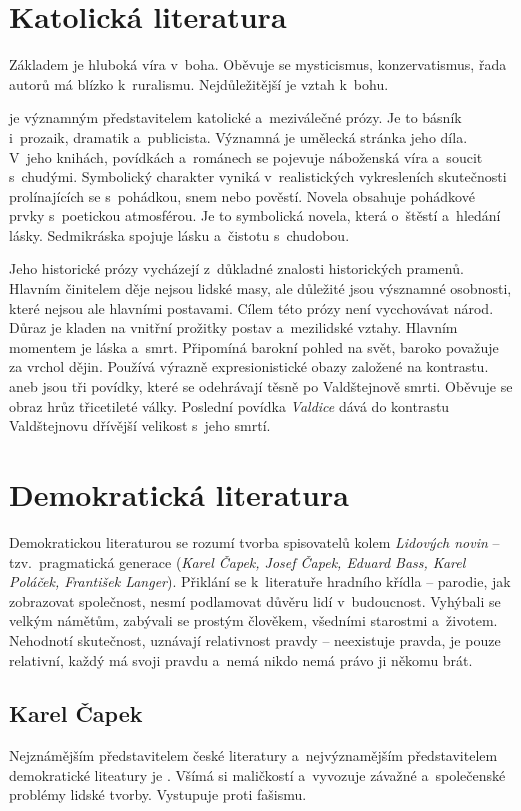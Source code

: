 \section{Katolická literatura}
Základem je hluboká víra v~boha. Oběvuje se mysticismus, konzervatismus,
řada autorů má blízko k~ruralismu. Nejdůležitější je vztah k~bohu.

\delic

 je významným představitelem katolické
a~meziválečné prózy. Je to básník i~prozaik, dramatik a~publicista.
Významná je umělecká stránka jeho díla. V~jeho knihách, povídkách
a~románech se pojevuje náboženská víra a~soucit s~chudými. Symbolický
charakter vyniká v~realistických vykresleních skutečnosti prolínajících
se s~pohádkou, snem nebo pověstí. Novela  obsahuje
pohádkové prvky s~poetickou atmosférou. Je to symbolická novela, která
o~štěstí a~hledání lásky. Sedmikráska spojuje lásku a~čistotu s~chudobou.

Jeho historické prózy vycházejí z~důkladné znalosti historických
pramenů. Hlavním činitelem děje nejsou lidské masy, ale důležité jsou
výsznamné osobnosti, které nejsou ale hlavními postavami. Cílem této
prózy není vycchovávat národ. Důraz je kladen na vnitřní prožitky postav
a~mezilidské vztahy. Hlavním momentem je láska a~smrt. Připomíná barokní
pohled na svět, baroko považuje za vrchol dějin. Používá výrazně
expresionistické obazy založené na kontrastu.  aneb
 jsou tři povídky, které se odehrávají
těsně po Valdštejnově smrti. Oběvuje se obraz hrůz třicetileté války.
Poslední povídka \emph{Valdice} dává do kontrastu Valdštejnovu dřívější
velikost s~jeho smrtí.

\section{Demokratická literatura}
Demokratickou literaturou se rozumí tvorba spisovatelů kolem
\emph{Lidových novin} -- tzv.~pragmatická generace (\emph{Karel Čapek,
Josef Čapek, Eduard Bass, Karel Poláček, František Langer}).  Přiklání
se k~literatuře hradního křídla -- parodie, jak zobrazovat společnost,
nesmí podlamovat důvěru lidí v~budoucnost. Vyhýbali se velkým námětům,
zabývali se prostým člověkem, všedními starostmi a~životem. Nehodnotí
skutečnost, uznávají relativnost pravdy -- neexistuje pravda, je pouze
relativní, každý má svoji pravdu a~nemá nikdo nemá právo ji někomu brát.

\subsection*{Karel Čapek}
Nejznámějším představitelem české literatury a~nejvýznamějším
představitelem demokratické liteatury je . Všímá si
maličkostí a~vyvozuje závažné a~společenské problémy lidské tvorby.
Vystupuje proti fašismu.

